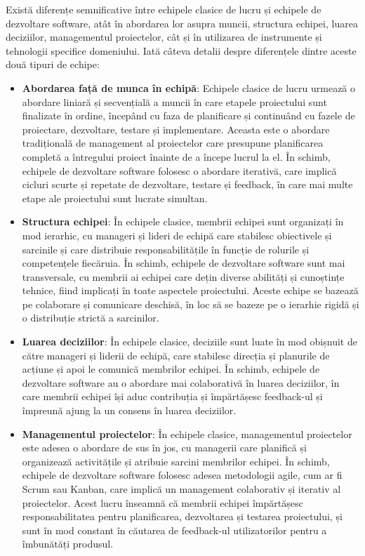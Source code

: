 \documentclass[a4paper, 12pt]{article}
\begin{document}
	\quad\quad Există diferențe semnificative între echipele clasice de lucru și echipele de dezvoltare software, atât în abordarea lor asupra muncii, structura echipei, luarea deciziilor, managementul proiectelor, cât și în utilizarea de instrumente și tehnologii specifice domeniului. Iată câteva detalii despre diferențele dintre aceste două tipuri de echipe:

\begin {itemize}

	\item \textbf{Abordarea față de munca în echipă}: Echipele clasice de lucru urmează o abordare liniară și secvențială a muncii în care etapele proiectului sunt finalizate în ordine, începând cu faza de planificare și continuând cu fazele de proiectare, dezvoltare, testare și implementare. Aceasta este o abordare tradițională de management al proiectelor care presupune planificarea completă a întregului proiect înainte de a începe lucrul la el. În schimb, echipele de dezvoltare software folosesc o abordare iterativă, care implică cicluri scurte și repetate de dezvoltare, testare și feedback, în care mai multe etape ale proiectului sunt lucrate simultan.


	\item \textbf{Structura echipei}: În echipele clasice, membrii echipei sunt organizați în mod ierarhic, cu manageri și lideri de echipă care stabilesc obiectivele și sarcinile și care distribuie responsabilitățile în funcție de rolurile și competențele fiecăruia. În schimb, echipele de dezvoltare software sunt mai transversale, cu membrii ai echipei care dețin diverse abilități și cunoștințe tehnice, fiind implicați în toate aspectele proiectului. Aceste echipe se bazează pe colaborare și comunicare deschisă, în loc să se bazeze pe o ierarhie rigidă și o distribuție strictă a sarcinilor.

	\item \textbf{Luarea deciziilor}: În echipele clasice, deciziile sunt luate în mod obișnuit de către manageri și liderii de echipă, care stabilesc direcția și planurile de acțiune și apoi le comunică membrilor echipei. În schimb, echipele de dezvoltare software au o abordare mai colaborativă în luarea deciziilor, în care membrii echipei își aduc contribuția și împărtășesc feedback-ul și împreună ajung la un consens în luarea deciziilor.

	\item\textbf{Managementul proiectelor}: În echipele clasice, managementul proiectelor este adesea o abordare de sus în jos, cu managerii care planifică și organizează activitățile și atribuie sarcini membrilor echipei. În schimb, echipele de dezvoltare software folosesc adesea metodologii agile, cum ar fi Scrum sau Kanban, care implică un management colaborativ și iterativ al proiectelor. Acest lucru înseamnă că membrii echipei împărtășesc responsabilitatea pentru planificarea, dezvoltarea și testarea proiectului, și sunt în mod constant în căutarea de feedback-ul utilizatorilor pentru a îmbunătăți produsul.


\end{itemize}
\end{document}
